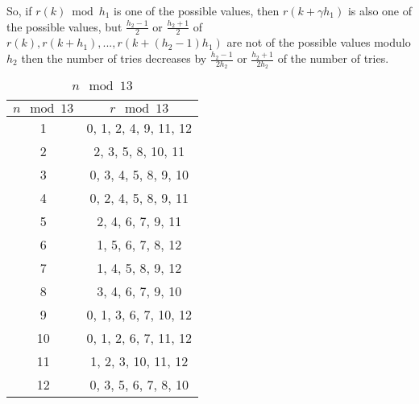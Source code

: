 \documentclass{article}
\begin{document}
{So, if $r(k) \bmod h_1$ is one of the possible values, then $r(k+ \gamma h_1)$ is also one of the possible values,
but $\frac{h_2-1}{2}$ or $\frac{h_2+1}{2}$ of $r(k), r(k+h_1), ..., r(k+(h_2-1)h_1)$
are not of the possible values modulo $h_2$
then the number of tries decreases by $\frac{h_2-1}{2h_2}$ or $\frac{h_2+1}{2h_2}$ of the number of tries.
\begin{table}
\centering
\caption{$n \mod 13$}
\label{table:a}
\begin{tabular}{|c|c|}
\hline
$n \mod 13$          & $r \mod 13$		\\ \hline
1 & 0, 1, 2, 4, 9, 11, 12		\\ \hline
2 & 2, 3, 5, 8, 10, 11		\\ \hline
3 & 0, 3, 4, 5, 8, 9, 10 		\\ \hline
4 & 0, 2, 4, 5, 8, 9, 11		\\ \hline
5 & 2, 4, 6, 7, 9, 11	\\ \hline
6 & 1, 5, 6, 7, 8, 12		\\ \hline
7 & 1, 4, 5, 8, 9, 12	\\ \hline
8 & 3, 4, 6, 7, 9, 10		\\ \hline
9 & 0, 1, 3, 6, 7, 10, 12		\\ \hline
10 & 0, 1, 2, 6, 7, 11, 12		\\ \hline
11 & 1, 2, 3, 10, 11, 12		\\ \hline
12 & 0, 3, 5, 6, 7, 8, 10	\\ \hline
\end{tabular}
\end{table}
}
\end{document}
